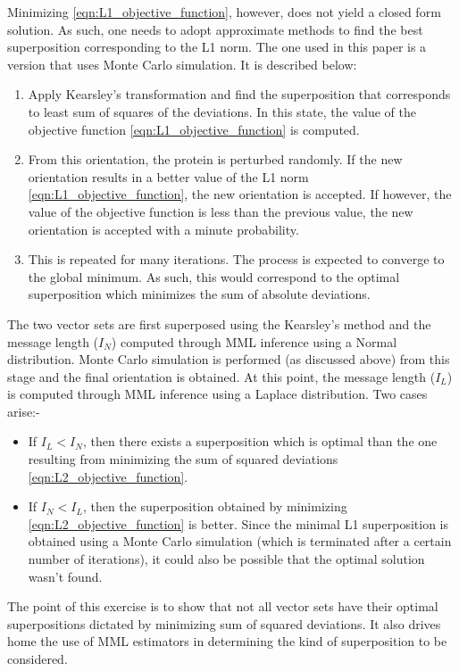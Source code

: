 \documentclass[wcp]{jmlr}
\begin{document}
Minimizing \eqref{eqn:L1_objective_function}, however, does not yield a closed form solution. 
As such, one needs to adopt approximate methods to find the best superposition corresponding
to the L1 norm. The one used in this paper is a version that uses Monte Carlo simulation. 
It is described below:
\begin{enumerate}
\item Apply Kearsley's transformation and find the superposition that corresponds
to least sum of squares of the deviations. In this state, the value of the 
objective function \eqref{eqn:L1_objective_function} is computed. 
\item From this orientation, the protein is perturbed randomly. If the new orientation
results in a better value of the L1 norm \eqref{eqn:L1_objective_function}, the new orientation is
accepted. If however, the value of the objective function is less than the previous
value, the new orientation is accepted with a minute probability.
\item This is repeated for many iterations. The process is expected to converge to
the global minimum. As such, this would correspond to the optimal
superposition which minimizes the sum of absolute deviations.
\end{enumerate}

The two vector sets are first superposed using the Kearsley's method and the message
length ($I_{N}$) computed through MML inference using a Normal distribution. 
Monte Carlo simulation is performed (as discussed above) from this stage and
the final orientation is obtained. At this point, the message length ($I_L$) is
computed through MML inference using a Laplace distribution. Two cases arise:-
\begin{itemize}
\item If $I_L < I_N$, then there exists a superposition which is optimal than the
one resulting from minimizing the sum of squared deviations \eqref{eqn:L2_objective_function}.
\item If $I_N < I_L$, then the superposition obtained by minimizing
\eqref{eqn:L2_objective_function} is better. Since the minimal L1 superposition
is obtained using a Monte Carlo simulation (which is terminated after a certain number
of iterations), it could also be possible that the optimal solution wasn't found.
\end{itemize}

The point of this exercise is to show that not all vector sets have their
optimal superpositions dictated by minimizing sum of squared deviations. It also drives
home the use of MML estimators in determining the kind of superposition to be
considered. 
\end{document}
